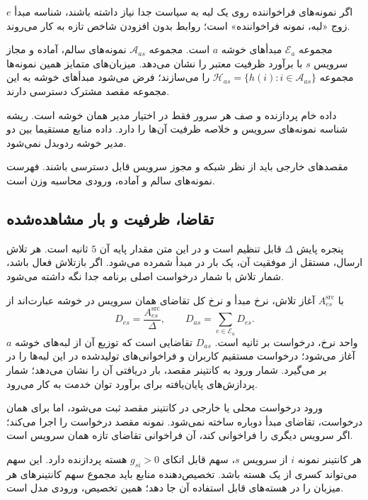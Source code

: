 اگر نمونه‌های فراخواننده روی یک لبه به سیاست جدا نیاز داشته باشند، شناسه مبدأ $e$ زوج «لبه، نمونه فراخواننده» است؛ روابط بدون افزودن شاخص تازه به کار می‌روند.

مجموعه $\mathcal E_a$ مبدأهای خوشه $a$ است. مجموعه $\mathcal A_{as}$ نمونه‌های سالم، آماده و مجاز سرویس $s$ با برآورد ظرفیت معتبر را نشان می‌دهد. میزبان‌های متمایز همین نمونه‌ها مجموعه $\mathcal H_{as}=\{h(i):i\in\mathcal A_{as}\}$ را می‌سازند؛ فرض می‌شود مبدأهای خوشه به این مجموعه مقصد مشترک دسترسی دارند.

داده خام پردازنده و صف هر سرور فقط در اختیار مدیر همان خوشه است. ریشه شناسه نمونه‌های سرویس و خلاصه ظرفیت آن‌ها را دارد. داده منابع مستقیما بین دو مدیر خوشه ردوبدل نمی‌شود.

مقصدهای خارجی باید از نظر شبکه و مجوز سرویس قابل دسترسی باشند. فهرست نمونه‌های سالم و آماده، ورودی محاسبه وزن است.

\subsection{تقاضا، ظرفیت و بار مشاهده‌شده}

پنجره پایش $\Delta$ قابل تنظیم است و در این متن مقدار پایه آن $5$ ثانیه است. هر تلاش ارسال، مستقل از موفقیت آن، یک بار در مبدأ شمرده می‌شود. اگر بازتلاش فعال باشد، شمار تلاش با شمار درخواست اصلی برنامه جدا نگه داشته می‌شود.

با $A^{\mathrm{src}}_{es}$ آغاز تلاش، نرخ مبدأ و نرخ کل تقاضای همان سرویس در خوشه عبارت‌اند از
\begin{equation}
 D_{es}=\frac{A^{\mathrm{src}}_{es}}{\Delta},\qquad
 D_{as}=\sum_{e\in\mathcal E_a}D_{es}.
 \label{eq:source-demand}
\end{equation}
واحد نرخ، درخواست بر ثانیه است. $D_{as}$ تقاضایی است که توزیع آن از لبه‌های خوشه $a$ آغاز می‌شود؛ درخواست مستقیم کاربران و فراخوانی‌های تولیدشده در این لبه‌ها را در بر می‌گیرد. شمار ورود به کانتینر مقصد، بار دریافتی آن را نشان می‌دهد؛ شمار پردازش‌های پایان‌یافته برای برآورد توان خدمت به کار می‌رود.

ورود درخواست محلی یا خارجی در کانتینر مقصد ثبت می‌شود، اما برای همان درخواست، تقاضای مبدأ دوباره ساخته نمی‌شود. نمونه مقصد درخواست را اجرا می‌کند؛ اگر سرویس دیگری را فراخوانی کند، آن فراخوانی تقاضای تازه همان سرویس است.

هر کانتینر نمونه $i$ از سرویس $s$، سهم قابل اتکای $g_{si}>0$ هسته پردازنده دارد. این سهم می‌تواند کسری از یک هسته باشد. تخصیص‌دهنده منابع باید مجموع سهم کانتینرهای هر میزبان را در هسته‌های قابل استفاده آن جا دهد؛ همین تخصیص، ورودی مدل است.

